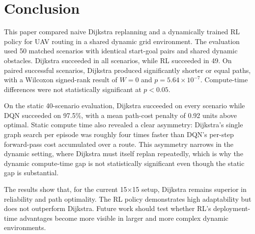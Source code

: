 \section{Conclusion}

This paper compared naive Dijkstra replanning and a dynamically trained RL policy for UAV routing in a shared dynamic grid environment. The evaluation used 50 matched scenarios with identical start-goal pairs and shared dynamic obstacles. Dijkstra succeeded in all scenarios, while RL succeeded in 49. On paired successful scenarios, Dijkstra produced significantly shorter or equal paths, with a Wilcoxon signed-rank result of $W=0$ and $p=5.64\times10^{-7}$. Compute-time differences were not statistically significant at $p<0.05$.

On the static 40-scenario evaluation, Dijkstra succeeded on every scenario while DQN succeeded on 97.5\%, with a mean path-cost penalty of 0.92 units above optimal. Static compute time also revealed a clear asymmetry: Dijkstra's single graph search per episode was roughly four times faster than DQN's per-step forward-pass cost accumulated over a route. This asymmetry narrows in the dynamic setting, where Dijkstra must itself replan repeatedly, which is why the dynamic compute-time gap is not statistically significant even though the static gap is substantial.

The results show that, for the current 15$\times$15 setup, Dijkstra remains superior in reliability and path optimality. The RL policy demonstrates high adaptability but does not outperform Dijkstra. Future work should test whether RL's deployment-time advantages become more visible in larger and more complex dynamic environments.
